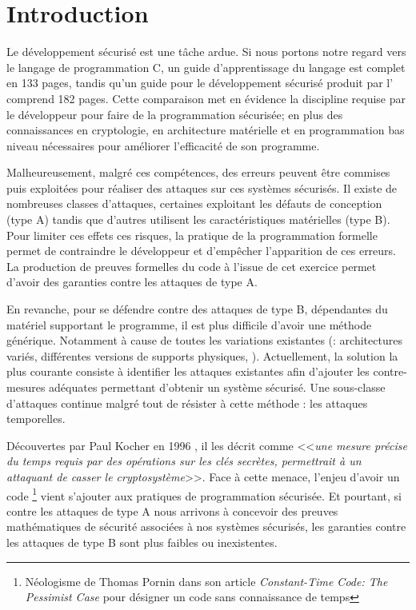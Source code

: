 \chapter*{Introduction}

Le développement sécurisé est une tâche ardue. Si nous portons notre regard vers le langage de programmation C, un guide \cite{progC_guide} d'apprentissage du langage est complet en 133 pages, tandis qu'un guide pour le développement sécurisé\cite{anssi_guideForSecureprogramming} produit par l' comprend 182 pages. Cette comparaison met en évidence la discipline requise par le développeur pour faire de la programmation sécurisée; en plus des connaissances en cryptologie, en architecture matérielle et en programmation bas niveau nécessaires pour améliorer l'efficacité de son programme. \medbreak

Malheureusement, malgré ces compétences, des erreurs peuvent être commises puis exploitées pour réaliser des attaques sur ces systèmes sécurisés. Il existe de nombreuses classes d'attaques, certaines exploitant les défauts de conception (type A) tandis que d'autres utilisent les caractéristiques matérielles (type B). Pour limiter ces effets ces risques, la pratique de la programmation formelle permet de contraindre le développeur et d'empêcher l'apparition de ces erreurs. La production de preuves formelles du code à l'issue de cet exercice permet d'avoir des garanties contre les attaques de type A.\medbreak

En revanche, pour se défendre contre des attaques de type B, dépendantes du matériel supportant le programme, il est plus difficile d'avoir une méthode générique. Notamment à cause de toutes les variations existantes (\eg : architectures variés, différentes versions de supports physiques, \etc). Actuellement, la solution la plus courante consiste à identifier les attaques existantes afin d'ajouter les contre-mesures adéquates permettant d'obtenir un système sécurisé. Une sous-classe d'attaques continue malgré tout de résister à cette méthode : les attaques temporelles.\medbreak

Découvertes par Paul Kocher en 1996 \cite{crypto-1996-1469}, il les décrit comme <<\textit{une mesure précise du temps requis par des opérations sur les clés secrètes, permettrait à un attaquant de casser le cryptosystème}>>. Face à cette menace, l'enjeu d'avoir un code \textit{}\footnote{Néologisme de Thomas Pornin dans son article \textit{Constant-Time Code: The Pessimist Case} \cite{constantTimePornin} pour désigner un code sans connaissance de temps} vient s'ajouter aux pratiques de programmation sécurisée. Et pourtant, si contre les attaques de type A nous arrivons à concevoir des preuves mathématiques de sécurité associées à nos systèmes sécurisés, les garanties contre les attaques de type B sont plus faibles ou inexistentes.\medbreak

